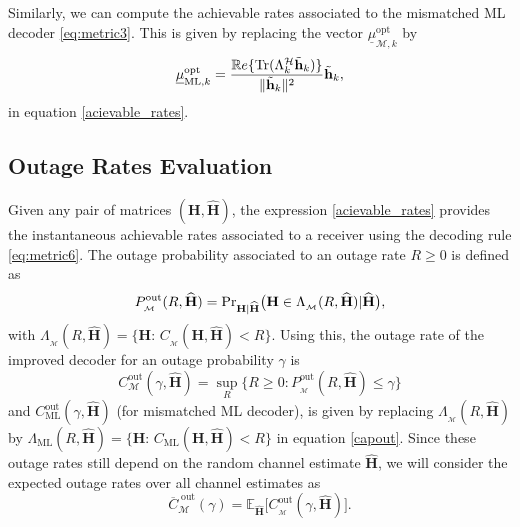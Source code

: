 \documentclass{article}
\def\H{{\mathbf H}}
\def\HH{\widehat{{\mathbf H}}}
\def\tg{\mathcal{H}}
\newcommand{\mb}{\mathbf}
\newcommand{\mc}{\mathcal}
\begin{document}
Similarly, we can compute the achievable rates associated to the mismatched ML decoder \eqref{eq:metric3}. This is given by replacing the vector $\underline{\mu}^{\textrm{opt}}_{\mc{M},k}$ by \vspace{-2mm}
\begin{equation}
\label{mismached_ML_capa}
\underline{\mu}^{\textrm{opt}}_{\textrm{ML},k}=\frac{ \mathbb{R}e\{{\rm Tr}(\Lambda_k^\tg \tilde{\mb{h}}_k) \}}{\|\tilde{\mb{h}}_k\|^2}\tilde{\mb{h}}_k,
\end{equation}
in equation \eqref{acievable_rates}.
\subsection{Outage Rates Evaluation}
Given any pair of matrices $(\H,\HH)$, the expression \eqref{acievable_rates} provides the instantaneous achievable rates associated to a receiver using the decoding rule \eqref{eq:metric6}. The outage probability associated to an outage rate $R \geq 0$ is defined as
\begin{equation}
P_{_{\mathcal{M}}}^{\mathrm{out}}(R,\widehat{\mathbf{H}})=\mathrm{Pr}_{\mathbf{H}| \widehat{\mathbf{H}}} \big(\mathbf{H}\in \Lambda_{_\mathcal{M}}(R,\widehat{\mathbf{H}})|\widehat{\mathbf{H}}\big), \notag
\end{equation}
with $\Lambda_{_\mathcal{M}}(R,\widehat{\mathbf{H}})=\big\{\mathbf{H}:\, C_{_\mathcal{M}}(\mathbf{H},\widehat{\mathbf{H}})<R\big\}$. Using this, the outage rate of the improved decoder for an outage probability $\gamma$ is
\begin{equation}
\label{capout}
C_{\mathcal{M}}^{\mathrm{out}}(\gamma,\widehat{\mathbf{H}})=\sup_R\big\{R \geq 0: P_{_{\mathcal{M}}}^{\mathrm{out}}(R,\widehat{\mathbf{H}})\leq \gamma\big\}
\end{equation}
and $C_{\textrm{ML}}^{\mathrm{out}}(\gamma,\widehat{\mathbf{H}})$ (for mismatched ML decoder), is given by replacing $\Lambda_{_\mathcal{M}}(R,\widehat{\mathbf{H}})$ by $\Lambda_{\textrm{ML}}(R,\widehat{\mathbf{H}})=\big\{\mathbf{H}:\, C_{\textrm{ML}}(\mathbf{H},\widehat{\mathbf{H}})<R\big\}$ in equation \eqref{capout}.
Since these outage rates still depend on the random channel estimate $\widehat{\mathbf{H}}$, we will consider the expected outage rates over all channel estimates as
\begin{equation}
\overline{C}_{\mathcal{M}}^{\; \mathrm{out}}(\gamma)=\mathbb{E}_{\widehat{\mathbf{H}}}\big[C_{_\mathcal{M}}^{\mathrm{out}}(\gamma,\widehat{\mathbf{H}})\big]. \label{EQ-capacity}
\end{equation}
\end{document}
